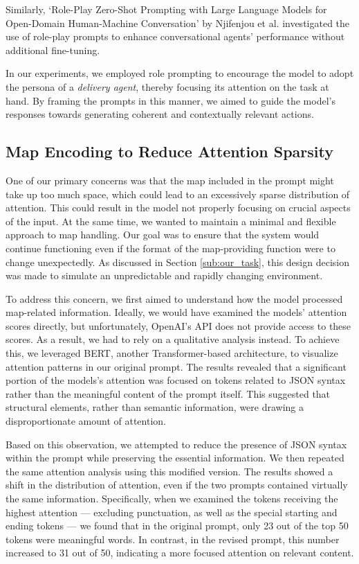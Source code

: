 Similarly, `Role-Play Zero-Shot Prompting with Large Language Models for Open-Domain
Human-Machine Conversation' by Njifenjou et al.
\cite{njifenjou2024roleplayzeroshotpromptinglarge} investigated the use of role-play
prompts to enhance conversational agents' performance without additional fine-tuning.

In our experiments, we employed role prompting to encourage the model to adopt
the persona of a \emph{delivery agent}, thereby focusing its attention on the
task at hand. By framing the prompts in this manner, we aimed to guide the model's
responses towards generating coherent and contextually relevant actions.

\subsection{Map Encoding to Reduce Attention Sparsity}

One of our primary concerns was that the map included in the prompt might take up
too much space, which could lead to an excessively sparse distribution of
attention. This could result in the model not properly focusing on crucial aspects
of the input. At the same time, we wanted to maintain a minimal and flexible approach
to map handling. Our goal was to ensure that the system would continue
functioning even if the format of the map-providing function were to change
unexpectedly. As discussed in Section \ref{sub:our_task}, this design decision
was made to simulate an unpredictable and rapidly changing environment.

To address this concern, we first aimed to understand how the model processed map-related
information. Ideally, we would have examined the models' attention scores
directly, but unfortunately, OpenAI's API does not provide access to these
scores. As a result, we had to rely on a qualitative analysis instead. To achieve
this, we leveraged BERT, another Transformer-based architecture, to visualize
attention patterns in our original prompt. The results revealed that a significant
portion of the models's attention was focused on tokens related to JSON syntax rather
than the meaningful content of the prompt itself. This suggested that structural
elements, rather than semantic information, were drawing a disproportionate
amount of attention.

Based on this observation, we attempted to reduce the presence of JSON syntax within
the prompt while preserving the essential information. We then repeated the same
attention analysis using this modified version. The results showed a shift in the
distribution of attention, even if the two prompts contained virtually the same
information. Specifically, when we examined the tokens receiving the highest
attention — excluding punctuation, as well as the special starting and ending tokens
— we found that in the original prompt, only 23 out of the top 50 tokens were
meaningful words. In contrast, in the revised prompt, this number increased to 31
out of 50, indicating a more focused attention on relevant content.

